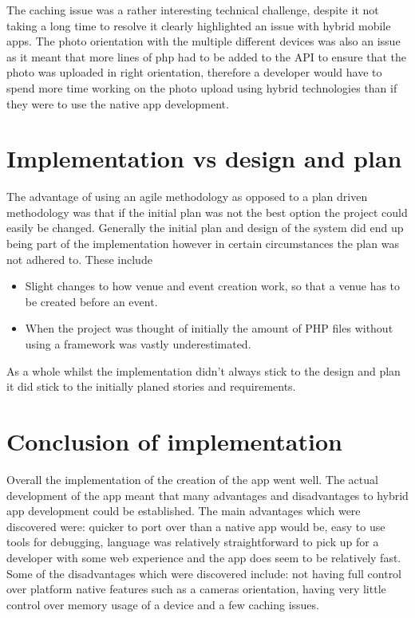 The caching issue was a rather interesting technical challenge, despite it not taking a long time to resolve it clearly highlighted an issue with hybrid mobile apps. The photo orientation with the multiple different devices was also an issue as it meant that more lines of php had to be added to the API to ensure that the photo was uploaded in right orientation, therefore a developer would have to spend more time working on the photo upload using hybrid technologies than if they were to use the native app development.

\section{Implementation vs design and plan}
The advantage of using an agile methodology as opposed to a plan driven methodology was that if the initial plan was not the best option the project could easily be changed. Generally the initial plan and design of the system did end up being part of the implementation however in certain circumstances the plan was not adhered to. These include 
\begin{itemize}
  \item Slight changes to how venue and event creation work, so that a venue has to be created before an event.
  \item When the project was thought of initially the amount of PHP files without using a framework was vastly underestimated.
\end{itemize}
As a whole whilst the implementation didn't always stick to the design and plan it did stick to the initially planed stories and requirements.
\section{Conclusion of implementation}
Overall the implementation of the creation of the app went well. The actual development of the app meant that many advantages and disadvantages to hybrid app development could be established. The main advantages which were discovered were: quicker to port over than a native app would be, easy to use tools for debugging, language was relatively straightforward to pick up for a developer with some web experience and the app does seem to be relatively fast. Some of the disadvantages which were discovered include: not having full control over platform native features such as a cameras orientation, having very little control over memory usage of a device and a few caching issues.

